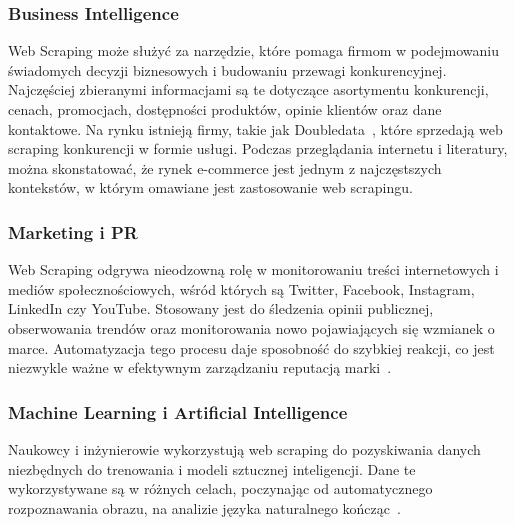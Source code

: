 \subsubsection{Business Intelligence}
Web Scraping może służyć za narzędzie, które pomaga firmom w podejmowaniu świadomych decyzji biznesowych i budowaniu przewagi konkurencyjnej.
Najczęściej zbieranymi informacjami są te dotyczące asortymentu konkurencji, cenach, promocjach, dostępności produktów, opinie klientów oraz dane kontaktowe.
Na rynku istnieją firmy, takie jak Doubledata~\cite{doubledata}, które sprzedają web scraping konkurencji w formie usługi.
Podczas przeglądania internetu i literatury, można skonstatować, że rynek e-commerce jest jednym z najczęstszych kontekstów, w którym omawiane jest zastosowanie web scrapingu.

\subsubsection{Marketing i PR}

Web Scraping odgrywa nieodzowną rolę w monitorowaniu treści internetowych i mediów społecznościowych, wśród których są Twitter, Facebook, Instagram, LinkedIn czy YouTube.
Stosowany jest do śledzenia opinii publicznej, obserwowania trendów oraz monitorowania nowo pojawiających się wzmianek o marce.
Automatyzacja tego procesu daje sposobność do szybkiej reakcji, co jest niezwykle ważne w efektywnym zarządzaniu reputacją marki~\cite{monitoring-social-media}.

\subsubsection{Machine Learning i Artificial Intelligence}

Naukowcy i inżynierowie wykorzystują web scraping do pozyskiwania danych niezbędnych do trenowania i modeli sztucznej inteligencji.
Dane te wykorzystywane są w różnych celach, poczynając od automatycznego rozpoznawania obrazu, na analizie języka naturalnego kończąc~\cite{openai-data-collection}.
